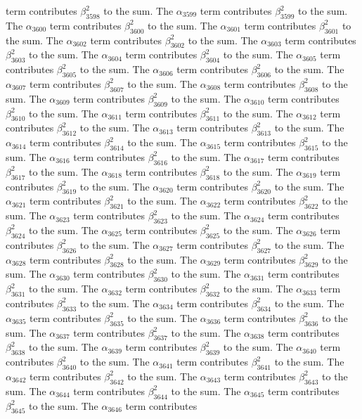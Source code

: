 \begin{lemma}
term contributes $\beta_{3598}^{2}$ to the sum. The $\alpha_{3599}$ term contributes $\beta_{3599}^{2}$ to the sum. The $\alpha_{3600}$ term contributes $\beta_{3600}^{2}$ to the sum. The $\alpha_{3601}$ term contributes $\beta_{3601}^{2}$ to the sum. The $\alpha_{3602}$ term contributes $\beta_{3602}^{2}$ to the sum. The $\alpha_{3603}$ term contributes $\beta_{3603}^{2}$ to the sum. The $\alpha_{3604}$ term contributes $\beta_{3604}^{2}$ to the sum. The $\alpha_{3605}$ term contributes $\beta_{3605}^{2}$ to the sum. The $\alpha_{3606}$ term contributes $\beta_{3606}^{2}$ to the sum. The $\alpha_{3607}$ term contributes $\beta_{3607}^{2}$ to the sum. The $\alpha_{3608}$ term contributes $\beta_{3608}^{2}$ to the sum. The $\alpha_{3609}$ term contributes $\beta_{3609}^{2}$ to the sum. The $\alpha_{3610}$ term contributes $\beta_{3610}^{2}$ to the sum. The $\alpha_{3611}$ term contributes $\beta_{3611}^{2}$ to the sum. The $\alpha_{3612}$ term contributes $\beta_{3612}^{2}$ to the sum. The $\alpha_{3613}$ term contributes $\beta_{3613}^{2}$ to the sum. The $\alpha_{3614}$ term contributes $\beta_{3614}^{2}$ to the sum. The $\alpha_{3615}$ term contributes $\beta_{3615}^{2}$ to the sum. The $\alpha_{3616}$ term contributes $\beta_{3616}^{2}$ to the sum. The $\alpha_{3617}$ term contributes $\beta_{3617}^{2}$ to the sum. The $\alpha_{3618}$ term contributes $\beta_{3618}^{2}$ to the sum. The $\alpha_{3619}$ term contributes $\beta_{3619}^{2}$ to the sum. The $\alpha_{3620}$ term contributes $\beta_{3620}^{2}$ to the sum. The $\alpha_{3621}$ term contributes $\beta_{3621}^{2}$ to the sum. The $\alpha_{3622}$ term contributes $\beta_{3622}^{2}$ to the sum. The $\alpha_{3623}$ term contributes $\beta_{3623}^{2}$ to the sum. The $\alpha_{3624}$ term contributes $\beta_{3624}^{2}$ to the sum. The $\alpha_{3625}$ term contributes $\beta_{3625}^{2}$ to the sum. The $\alpha_{3626}$ term contributes $\beta_{3626}^{2}$ to the sum. The $\alpha_{3627}$ term contributes $\beta_{3627}^{2}$ to the sum. The $\alpha_{3628}$ term contributes $\beta_{3628}^{2}$ to the sum. The $\alpha_{3629}$ term contributes $\beta_{3629}^{2}$ to the sum. The $\alpha_{3630}$ term contributes $\beta_{3630}^{2}$ to the sum. The $\alpha_{3631}$ term contributes $\beta_{3631}^{2}$ to the sum. The $\alpha_{3632}$ term contributes $\beta_{3632}^{2}$ to the sum. The $\alpha_{3633}$ term contributes $\beta_{3633}^{2}$ to the sum. The $\alpha_{3634}$ term contributes $\beta_{3634}^{2}$ to the sum. The $\alpha_{3635}$ term contributes $\beta_{3635}^{2}$ to the sum. The $\alpha_{3636}$ term contributes $\beta_{3636}^{2}$ to the sum. The $\alpha_{3637}$ term contributes $\beta_{3637}^{2}$ to the sum. The $\alpha_{3638}$ term contributes $\beta_{3638}^{2}$ to the sum. The $\alpha_{3639}$ term contributes $\beta_{3639}^{2}$ to the sum. The $\alpha_{3640}$ term contributes $\beta_{3640}^{2}$ to the sum. The $\alpha_{3641}$ term contributes $\beta_{3641}^{2}$ to the sum. The $\alpha_{3642}$ term contributes $\beta_{3642}^{2}$ to the sum. The $\alpha_{3643}$ term contributes $\beta_{3643}^{2}$ to the sum. The $\alpha_{3644}$ term contributes $\beta_{3644}^{2}$ to the sum. The $\alpha_{3645}$ term contributes $\beta_{3645}^{2}$ to the sum. The $\alpha_{3646}$ term contributes 
\end{lemma}
